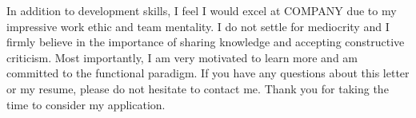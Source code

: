 \documentclass[11pt, a4paper]{awesome-cv}
\begin{document}
\begin{cvletter}
In addition to development skills, I feel I would excel at COMPANY due to my
  impressive work ethic and team mentality.  I do not settle for mediocrity and
  I firmly believe in the importance of sharing knowledge and accepting
  constructive criticism.  Most importantly, I am very motivated to learn more
  and am committed to the functional paradigm.  If you have any questions about
  this letter or my resume, please do not hesitate to contact me.  Thank you
  for taking the time to consider my application.

\end{cvletter}

\makeletterclosing
\end{document}
